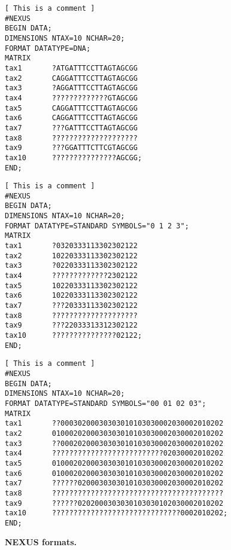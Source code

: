 \documentclass[a4paper,12pt]{article}
\begin{document}
\begin{figure}
\begin{small}
\begin{Verbatim}[frame=single, label=Nexus nucleotides, samepage=true, baselinestretch=0.5]
[ This is a comment ]
#NEXUS
BEGIN DATA;
DIMENSIONS NTAX=10 NCHAR=20;
FORMAT DATATYPE=DNA;
MATRIX
tax1       ?ATGATTTCCTTAGTAGCGG
tax2       CAGGATTTCCTTAGTAGCGG
tax3       ?AGGATTTCCTTAGTAGCGG
tax4       ?????????????GTAGCGG
tax5       CAGGATTTCCTTAGTAGCGG
tax6       CAGGATTTCCTTAGTAGCGG
tax7       ???GATTTCCTTAGTAGCGG
tax8       ????????????????????
tax9       ???GGATTTCTTCGTAGCGG
tax10      ???????????????AGCGG;
END;	                      	                                      	                                      	                  
\end{Verbatim}
\end{small}

\begin{small}
\begin{Verbatim}[frame=single, label=Nexus digits, samepage=true, baselinestretch=0.5]
[ This is a comment ]
#NEXUS
BEGIN DATA;
DIMENSIONS NTAX=10 NCHAR=20;
FORMAT DATATYPE=STANDARD SYMBOLS="0 1 2 3";
MATRIX
tax1       ?0320333113302302122
tax2       10220333113302302122
tax3       ?0220333113302302122
tax4       ?????????????2302122
tax5       10220333113302302122
tax6       10220333113302302122
tax7       ???20333113302302122
tax8       ????????????????????
tax9       ???22033313312302122
tax10      ???????????????02122;
END;	                      	                                      	                                      	                  
\end{Verbatim}
\end{small}

\begin{small}
\begin{Verbatim}[frame=single, label=Nexus digits, samepage=true, baselinestretch=0.5]
[ This is a comment ]
#NEXUS
BEGIN DATA;
DIMENSIONS NTAX=10 NCHAR=20;
FORMAT DATATYPE=STANDARD SYMBOLS="00 01 02 03";
MATRIX
tax1       ??00030200030303010103030002030002010202
tax2       0100020200030303010103030002030002010202
tax3       ??00020200030303010103030002030002010202
tax4       ??????????????????????????02030002010202
tax5       0100020200030303010103030002030002010202
tax6       0100020200030303010103030002030002010202
tax7       ??????0200030303010103030002030002010202
tax8       ????????????????????????????????????????
tax9       ??????0202000303030103030102030002010202
tax10      ??????????????????????????????0002010202;
END;	                      	                                      	                                      	                  
\end{Verbatim}
\end{small}
\caption{\bf NEXUS formats.}\label{fig:nexus}
\end{figure}
\end{document}
